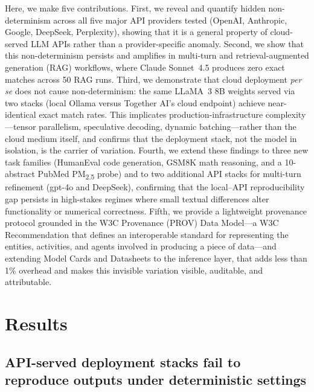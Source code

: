 \documentclass[sn-nature]{sn-jnl}
\begin{document}
Here, we make five contributions.
First, we reveal and quantify hidden non-determinism across all five major API providers tested (OpenAI, Anthropic, Google, DeepSeek, Perplexity), showing that it is a general property of cloud-served LLM APIs rather than a provider-specific anomaly.
Second, we show that this non-determinism persists and amplifies in multi-turn and retrieval-augmented generation (RAG) workflows, where Claude Sonnet~4.5 produces zero exact matches across 50 RAG runs.
Third, we demonstrate that cloud deployment \emph{per se} does not cause non-determinism: the same LLaMA~3 8B weights served via two stacks (local Ollama versus Together AI's cloud endpoint) achieve near-identical exact match rates. This implicates production-infrastructure complexity---tensor parallelism, speculative decoding, dynamic batching---rather than the cloud medium itself, and confirms that the deployment stack, not the model in isolation, is the carrier of variation.
Fourth, we extend these findings to three new task families (HumanEval code generation, GSM8K math reasoning, and a 10-abstract PubMed PM\textsubscript{2.5} probe) and to two additional API stacks for multi-turn refinement (gpt-4o and DeepSeek), confirming that the local--API reproducibility gap persists in high-stakes regimes where small textual differences alter functionality or numerical correctness.
Fifth, we provide a lightweight provenance protocol grounded in the W3C Provenance (PROV) Data Model\cite{w3cprov2013}---a W3C Recommendation that defines an interoperable standard for representing the entities, activities, and agents involved in producing a piece of data---and extending Model Cards\cite{mitchell2019model} and Datasheets\cite{gebru2021datasheets} to the inference layer, that adds less than 1\% overhead and makes this invisible variation visible, auditable, and attributable.


\section{Results}\label{sec:results}

\subsection{API-served deployment stacks fail to reproduce outputs under deterministic settings}\label{subsec:greedy}
\end{document}
